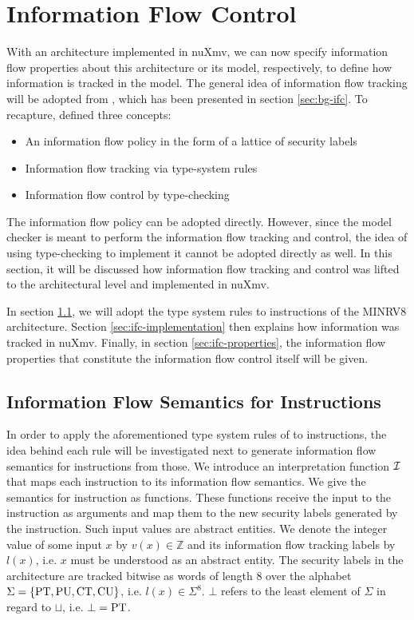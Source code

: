 
\chapter{Information Flow Control}
\label{chp:ifc}

With an architecture implemented in nuXmv, we can now specify information flow properties about this architecture or its model, respectively, to define how information is tracked in the model.
The general idea of information flow tracking will be adopted from \cite{Ferraiuolo17}, which has been presented in section \ref{sec:bg-ifc}.
To recapture, \citeauthor{Ferraiuolo17} defined three concepts:
\begin{itemize}
    \item An information flow policy in the form of a lattice of security labels
    \item Information flow tracking via type-system rules
    \item Information flow control by type-checking
\end{itemize}

The information flow policy can be adopted directly.
However, since the model checker is meant to perform the information flow tracking and control, the idea of using type-checking to implement it cannot be adopted directly as well.
In this section, it will be discussed how information flow tracking and control was lifted to the architectural level and implemented in nuXmv.

In section \ref{sec:ifc-model}, we will adopt the type system rules to instructions of the MINRV8 architecture.
Section \ref{sec:ifc-implementation} then explains how information was tracked in nuXmv.
Finally, in section \ref{sec:ifc-properties}, the information flow properties that constitute the information flow control itself will be given.

\section{Information Flow Semantics for Instructions}
\label{sec:ifc-model}

In order to apply the aforementioned type system rules of \cite{Ferraiuolo17} to instructions, the idea behind each rule will be investigated next to generate information flow semantics for instructions from those.
We introduce an interpretation function $ \mathcal{I} $ that maps each instruction to its information flow semantics.
We give the semantics for instruction as functions.
These functions receive the input to the instruction as arguments and map them to the new security labels generated by the instruction.
Such input values are abstract entities.
We denote the integer value of some input $ x $ by $ v(x) \in \mathbb{Z} $ and its information flow tracking labels by $ l(x) $, i.e. $ x $ must be understood as an abstract entity.
The security labels in the architecture are tracked bitwise as words of length 8 over the alphabet $ \Sigma = \{ \text{PT}, \text{PU}, \text{CT}, \text{CU} \} $, i.e. $ l(x) \in \Sigma^8 $.
$ \bot $ refers to the least element of $ \Sigma $ in regard to $ \sqcup $, i.e. $ \bot = \text{PT} $.

